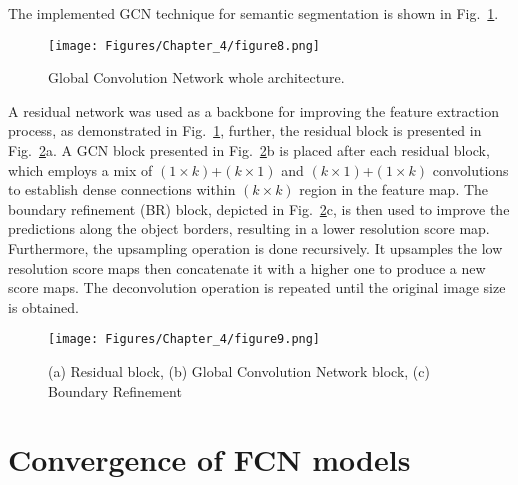 The implemented GCN technique for semantic segmentation is shown in Fig.~\ref{fig:gcn}.
\begin{figure} [h!]
	\begin{center}
		\texttt{[image: Figures/Chapter\_4/figure8.png]}
	\end{center}
	\caption{Global Convolution Network whole architecture.} 
	\label{fig:gcn}
\end{figure}

A residual network was used as a backbone for improving the feature extraction process, as demonstrated in Fig.~\ref{fig:gcn}, further, the residual block is presented in Fig.~\ref{fig:res_gcn_br}a.
A GCN block presented in Fig.~\ref{fig:res_gcn_br}b is placed after each residual block, which employs a mix of \((1\times k)\)+\((k\times 1)\) and \((k\times 1)\)+\((1\times k)\) convolutions to establish dense connections within \((k\times k)\) region in the feature map.
The boundary refinement (BR) block, depicted in Fig.~\ref{fig:res_gcn_br}c, is then used to improve the predictions along the object borders, resulting in a lower resolution score map.
Furthermore, the upsampling operation is done recursively. 
It upsamples the low resolution score maps then concatenate it with a higher one to produce a new 
score maps.
The deconvolution operation is repeated until the original image size is 
obtained.
\begin{figure} [h!]
	\begin{center}
		\texttt{[image: Figures/Chapter\_4/figure9.png]}
	\end{center}
	\caption{(a) Residual block, (b) Global Convolution Network block, (c) 
		Boundary Refinement} 
	\label{fig:res_gcn_br}
\end{figure}

\section{Convergence of FCN models}


